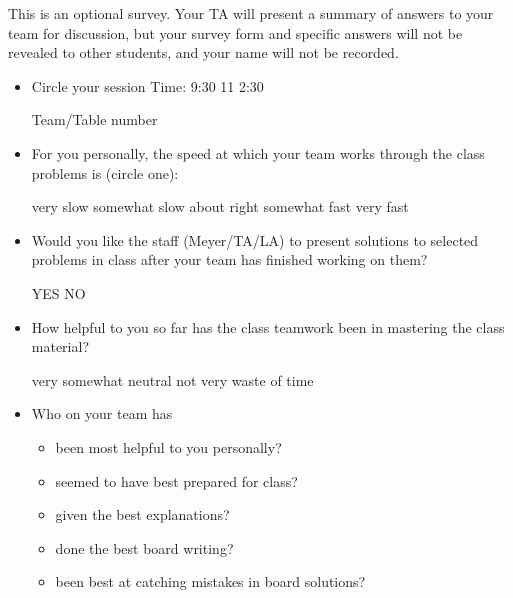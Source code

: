 \documentclass[handout]{mcs}
\begin{document}

This is an optional survey.  Your TA will present a summary of answers
to your team for discussion, but your survey form and specific answers
will not be revealed to other students, and your name will not be
recorded.

\begin{itemize}

\item 
Circle your session Time: \hspace{0.4in} 9:30 \hspace{0.4in} 11 \hspace{0.4in} 2:30

Team/Table number\brule{0.5in}

\item For you personally, the speed at which your team works through
  the class problems is (circle one):

very slow\hspace{0.4in} somewhat slow\hspace{0.4in} about
right\hspace{0.4in} somewhat fast\hspace{0.4in} very fast

\item Would you like the staff (Meyer/TA/LA) to present solutions to
  selected problems in class after your team has finished working on
  them?
\begin{center}
YES \hspace{1in} NO
\end{center}

\item How helpful to you so far has the class teamwork been in
  mastering the class material?

\begin{center}
very\hspace{0.5in} somewhat \hspace{0.5in} neutral\hspace{0.5in} not
very \hspace{0.5in} waste of time
\end{center}

\item Who on your team has
  \begin{itemize}
    \item been most helpful to you personally?\hfill\brule{2in}
    \item seemed to have best prepared for class?\hfill\brule{2in}
    \item given the best explanations?\hfill\brule{2in}
    \item done the best board writing?\hfill\brule{2in}
    \item been best at catching mistakes in board solutions?\hfill\brule{2in}
  \end{itemize}


\end{itemize}
\end{document}
